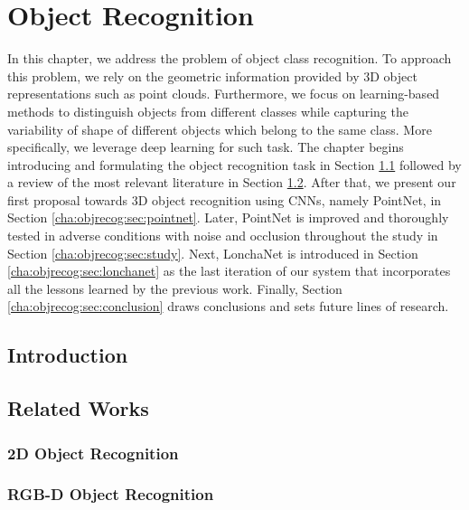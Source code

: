 \chapter{Object Recognition}
\label{cha:objrecog}

\begin{chapterabstract}
In this chapter, we address the problem of object class recognition. To approach this problem, we rely on the geometric information provided by 3D object representations such as point clouds. Furthermore, we focus on learning-based methods to distinguish objects from different classes while capturing the variability of shape of different objects which belong to the same class. More specifically, we leverage deep learning for such task. The chapter begins introducing and formulating the object recognition task in Section \ref{cha:objrecog:sec:introduction} followed by a review of the most relevant literature in Section \ref{cha:objrecog:sec:relatedworks}. After that, we present our first proposal towards 3D object recognition using \acp{CNN}, namely PointNet, in Section \ref{cha:objrecog:sec:pointnet}. Later, PointNet is improved and thoroughly tested in adverse conditions with noise and occlusion throughout the study in Section \ref{cha:objrecog:sec:study}. Next, LonchaNet is introduced in Section \ref{cha:objrecog:sec:lonchanet} as the last iteration of our system that incorporates all the lessons learned by the previous work. Finally, Section \ref{cha:objrecog:sec:conclusion} draws conclusions and sets future lines of research.
\end{chapterabstract}

\section{Introduction}
\label{cha:objrecog:sec:introduction}


\section{Related Works}
\label{cha:objrecog:sec:relatedworks}

\subsection{2D Object Recognition}
\label{cha:objrecog:sec:relatedworks:subsec:2d}

\subsection{RGB-D Object Recognition}
\label{cha:objrecog:sec:relatedworks:subsec:rgbd}

